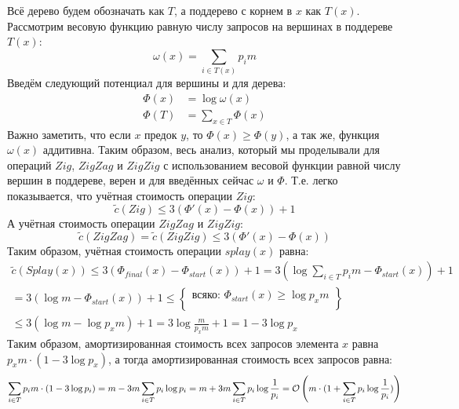 \begin{solution}
Всё дерево будем обозначать как $T$, а поддерево с корнем в $x$ как $T(x)$. Рассмотрим весовую функцию равную числу запросов на вершинах в поддереве $T(x)$:
\[ \omega(x) = \sum_{i \in T(x)}{p_i m} \]
Введём следующий потенциал для вершины и для дерева:
\begin{align*}
	\Phi(x) & = \log{\omega(x)} \\
	\Phi(T) & = \sum_{x \in T}{\Phi(x)}
\end{align*}
Важно заметить, что если $x$ предок $y$, то $\Phi(x) \geqslant \Phi(y)$, а так же, функция $\omega(x)$ аддитивна. Таким образом, весь анализ, который мы проделывали для операций $Zig$, $ZigZag$ и $ZigZig$ с использованием весовой функции равной числу вершин в поддереве, верен и для введённых сейчас $\omega$ и $\Phi$. Т.е. легко показывается, что учётная стоимость операции $Zig$:
\[
	{\tilde c}(Zig) \leqslant 3(\Phi'(x) - \Phi(x)) + 1
\]
А учётная стоимость операции $ZigZag$ и $ZigZig$:
\[
	{\tilde c}(ZigZag) = {\tilde c}(ZigZig) \leqslant 3(\Phi'(x) - \Phi(x))
\]
Таким образом, учётная стоимость операции $splay(x)$ равна:
\begin{align*}
	{\tilde c}(Splay(x)) \leq 3(\Phi_{final}(x) - \Phi_{start}(x)) + 1  
	= 3(\log{\sum_{i \in T}{p_im}} - \Phi_{start}(x)) + 1 
	\\ = 3(\log{m}-\Phi_{start}(x)) + 1 \leqslant
	\begin{Bmatrix}
	\text{всяко: }\Phi_{start}(x) \geqslant \log{p_{x}m} \\
	\end{Bmatrix} \\
	\leqslant 3(\log{m}-\log{p_x m}) + 1 = 3\log{\frac{m}{p_xm}} + 1 = 1-3\log{p_x}
\end{align*}
Таким образом, амортизированная стоимость всех запросов элемента $x$ равна $p_xm \cdot (1 - 3\log{p_x})$, а тогда амортизированная стоимость всех запросов равна:
\[
	\sum_{i \in T}{p_i m \cdot (1 - 3\log{p_i})} = m - 3m\sum_{i\in T}{p_i\log{p_i}} = m + 3m\sum_{i\in T}{p_i\log{\frac{1}{p_i}}} = \mathcal{O}\left(m\cdot(1+\sum_{i\in T}{p_i\log{\frac{1}{p_i}}})\right) 
\]
\xqed
\end{solution}

